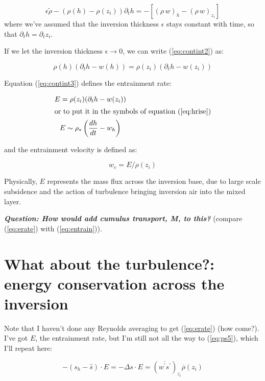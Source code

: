 \documentclass[12pt]{article}
\begin{document}
\begin{equation}
  \label{eq:contint2}
  \epsilon \widetilde{\rho} - ( \rho(h) - \rho(z_i)) \partial_t h = - \left [ (\rho\, w)_h - (\rho\, w)_{z_i} \right ]
\end{equation}
where we've assumed that the inversion thickness $\epsilon$ stays constant with time, so that $\partial_t h = \partial_t z_i$.

If we let
the inversion thickness $\epsilon \rightarrow 0 $, we can write (\ref{eq:contint2}) as:

\begin{equation}
  \label{eq:contint3}
 \rho(h)(\partial_t h - w(h)) = \rho(z_i) (\partial_t h  - w(z_i) ) 
\end{equation}

Equation (\ref{eq:contint3}) defines the entrainment rate:

\begin{gather}
  \label{eq:erate}
  E = \rho(z_i) (\partial_t h  - w(z_i) )\\
\intertext{or to put it in the symbols of equation (\ref{eq:hrise})}
E \sim \rho_* \left (\frac{dh }{dt}  - w_h \right )
\end{gather}

and the entrainment velocity is defined as:

\begin{equation}
  \label{eq:evel}
  w_e = E / \rho(z_i)
\end{equation}

Physically, $E$ represents the mass flux across the inversion base, due to large scale subsidence and
the action of turbulence bringing inversion air into the mixed layer.


\textbf{\textit{Question: How would add cumulus transport, M, to this?}}  (compare (\ref{eq:erate}) with (\ref{eq:entrain})).

\section{What about the turbulence?: energy conservation across the inversion}
\label{sec:what-about-turb}

Note that I haven't done any Reynolds averaging to get (\ref{eq:erate}) (how come?).  I've got $E$, the
entrainment rate, but I'm still not all the way to (\ref{eq:ps5}), which I'll repeat here:


  \begin{equation}
    \label{eq:hd0}
  - (s_h - \hat{s}) \cdot E  =  - \Delta s \cdot E = \left ( \overline{w^\prime s^\prime} \right )_{z_i} \overline{\rho}(z_i)
  \end{equation}
\end{document}
